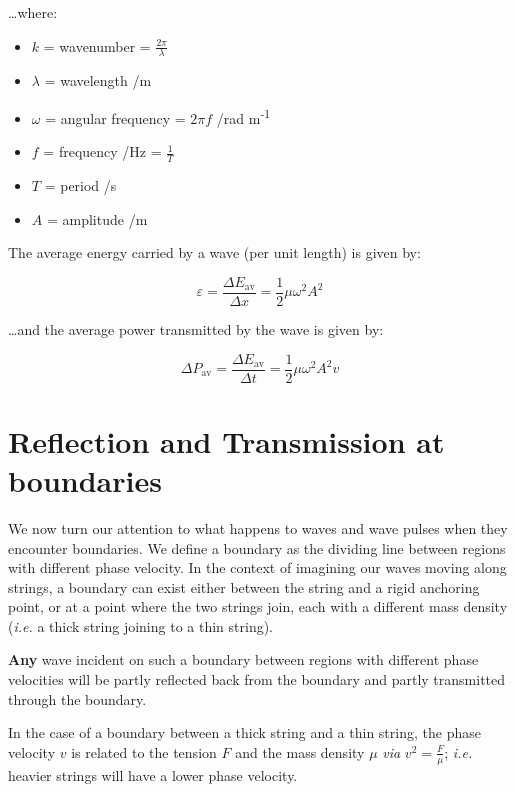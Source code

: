 \documentclass[
]{book}
\providecommand{\tightlist}{%
  \setlength{\itemsep}{0pt}\setlength{\parskip}{0pt}}
\begin{document}
\ldots where:

\begin{itemize}
\tightlist
\item
  \(k\) = wavenumber = \(\frac{2\pi}{\lambda}\)
\item
  \(\lambda\) = wavelength /m
\item
  \(\omega\) = angular frequency = \(2\pi f\) /rad m\textsuperscript{-1}
\item
  \(f\) = frequency /Hz = \(\frac{1}{T}\)
\item
  \(T\) = period /s
\item
  \(A\) = amplitude /m
\end{itemize}

The average energy carried by a wave (per unit length) is given by:

\begin{equation}
\varepsilon = \frac{\Delta E_{\mathrm{av}}}{\Delta x} = \frac{1}{2} \mu \omega^2 A^2
\end{equation}

\ldots and the average power transmitted by the wave is given by:

\begin{equation}
\Delta P_{\mathrm{av}} = \frac{\Delta E_{\mathrm{av}}}{\Delta t} = \frac{1}{2}\mu \omega^2 A^2 v
\end{equation}

\hypertarget{sec-ch8-reflectiontrans}{%
\chapter{Reflection and Transmission at boundaries}\label{sec-ch8-reflectiontrans}}

We now turn our attention to what happens to waves and wave pulses when they encounter boundaries. We define a boundary as the dividing line between regions with different phase velocity. In the context of imagining our waves moving along strings, a boundary can exist either between the string and a rigid anchoring point, or at a point where the two strings join, each with a different mass density (\emph{i.e.} a thick string joining to a thin string).

\textbf{Any} wave incident on such a boundary between regions with different phase velocities will be partly reflected back from the boundary and partly transmitted through the boundary.

In the case of a boundary between a thick string and a thin string, the phase velocity \(v\) is related to the tension \(F\) and the mass density \(\mu\) \emph{via} \(v^2 = \frac{F}{\mu}\); \emph{i.e.} heavier strings will have a lower phase velocity.
\end{document}
